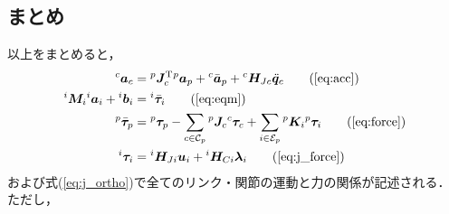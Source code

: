 ﻿\documentclass[a4paper]{jsarticle}
\begin{document}
\subsection{まとめ}
以上をまとめると，
\begin{align}
{}^{c}\bm{a}_{c}&=
{}^{p}\bm{J}_{c}^{\mathrm{T}}{}^{p}\bm{a}_{p}+{}^{c}\bar{\bm{a}}_{p}
+{}^{c}\bm{H}_{Jc}\ddot{\bm{q}}_{c}
\tag{\ref{eq:acc}} \\
{}^{i}\bm{M}_{i}{}^{i}\bm{a}_{i}+{}^{i}\bm{b}_{i}&=
{}^{i}\bar{\bm{\tau}}_{i}
\tag{\ref{eq:eqm}} \\
{}^{p}\bar{\bm{\tau}}_{p}&=
 {}^{p}\bm{\tau}_{p}
 -\sum_{c\in\mathcal{C}_{p}}{}^{p}\bm{J}_{c}{}^{c}\bm{\tau}_{c}
 +\sum_{i\in\mathcal{E}_{p}}{}^{p}\bm{K}_{i}{}^{p}\bm{\tau}_{i}
\tag{\ref{eq:force}} \\
{}^{i}\bm{\tau}_{i}&=
 {}^{i}\bm{H}_{Ji}\bm{u}_{i}+{}^{i}\bm{H}_{Ci}\bm{\lambda}_{i}
\tag{\ref{eq:j_force}}
\end{align}
および式(\ref{eq:j_ortho})で全てのリンク・関節の運動と力の関係が記述される．
ただし，
\end{document}
